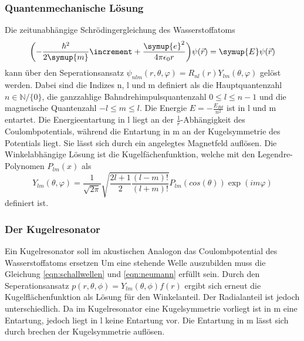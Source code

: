 \subsubsection{Quantenmechanische Lösung}
Die zeitunabhängige Schrödingergleichung des Wasserstoffatoms
\begin{equation}
    \biggl(-\frac{\hbar^2}{2 \symup{m}} \increment + \frac{\symup{e}^2}{4 \pi \epsilon_0 r}\biggr)\psi(\vec{r}) = \symup{E} \psi(\vec{r})
    \label{eqn:schrödingerwass}
\end{equation}
kann über den Seperationsansatz $\psi_{nlm}(r,\theta, \varphi) = R_{nl}(r) Y_{lm}(\theta, \varphi)$ gelöst werden.
Dabei sind die Indizes n, l und m definiert als die Hauptquantenzahl $n \in \mathbb{N}/\{0\}$, die ganzzahlige Bahndrehimpulsquantenzahl
$0 \leq l \leq n-1$ und die magnetische Quantenzahl $ -l \leq m \leq l$.
Die Energie $E = -\frac{E_{Rd}}{n^2}$ ist in l und m entartet. Die Energieentartung in l liegt an der $\frac{1}{r}$-Abhängigkeit des Coulombpotentials, während die 
Entartung in m an der Kugelsymmetrie des Potentials liegt. Sie lässt sich durch ein angelegtes Magnetfeld auflösen. 
Die Winkelabhängige Lösung ist die Kugelfächenfunktion, welche mit den Legendre-Polynomen $P_{lm}(x)$ als
\begin{equation}
    Y_{lm}(\theta, \varphi) = \frac{1}{\sqrt{2\pi}} \sqrt{\frac{2l+1}{2}\frac{(l-m)!}{(l+m)!}} P_{lm}(cos(\theta)) \exp(im\varphi)
\end{equation}
definiert ist.
\subsubsection{Der Kugelresonator}
Ein Kugelresonator soll im akustischen Analogon das Coulombpotential des Wasserstoffatoms ersetzen
Um eine stehende Welle auszubilden muss die Gleichung \ref{eqn:schallwellen} und \ref{eqn:neumann} erfüllt sein. Durch den Seperationsansatz
$p(r, \theta, \phi) = Y_{lm}(\theta, \phi) f(r)$ ergibt sich erneut die Kugelflächenfunktion als Lösung für den Winkelanteil.
Der Radialanteil ist jedoch unterschiedlich. Da im Kugelresonator eine Kugelsymmetrie vorliegt ist in m eine Entartung, jedoch liegt in l keine Entartung
vor. Die Entartung in m lässt sich durch brechen der Kugelsymmetrie auflösen.

